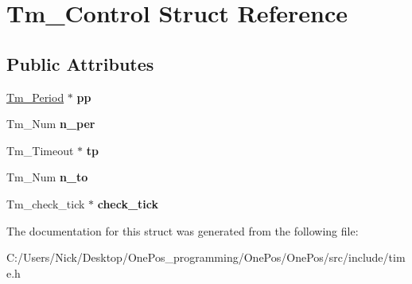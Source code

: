 \hypertarget{struct_tm___control}{\section{Tm\-\_\-\-Control Struct Reference}
\label{struct_tm___control}
}
\subsection*{Public Attributes}
\begin{DoxyCompactItemize}
\item 
\hypertarget{struct_tm___control_ac450cd3090f95328d7811b96deecdc17}{\hyperlink{struct_tm___period}{Tm\-\_\-\-Period} $\ast$ {\bfseries pp}}\label{struct_tm___control_ac450cd3090f95328d7811b96deecdc17}

\item 
\hypertarget{struct_tm___control_ad81de2fe53b1d8ad3c377749db5d26d4}{Tm\-\_\-\-Num {\bfseries n\-\_\-per}}\label{struct_tm___control_ad81de2fe53b1d8ad3c377749db5d26d4}

\item 
\hypertarget{struct_tm___control_abf67e09d2bec9804da39b82e8b663fb2}{Tm\-\_\-\-Timeout $\ast$ {\bfseries tp}}\label{struct_tm___control_abf67e09d2bec9804da39b82e8b663fb2}

\item 
\hypertarget{struct_tm___control_ab1d1906372bf292b1c2b3d3e0b2dd815}{Tm\-\_\-\-Num {\bfseries n\-\_\-to}}\label{struct_tm___control_ab1d1906372bf292b1c2b3d3e0b2dd815}

\item 
\hypertarget{struct_tm___control_a0063463ad20fd5170a3a2b1a0f9bcafc}{Tm\-\_\-check\-\_\-tick $\ast$ {\bfseries check\-\_\-tick}}\label{struct_tm___control_a0063463ad20fd5170a3a2b1a0f9bcafc}

\end{DoxyCompactItemize}


The documentation for this struct was generated from the following file\-:\begin{DoxyCompactItemize}
\item 
C\-:/\-Users/\-Nick/\-Desktop/\-One\-Pos\-\_\-programming/\-One\-Pos/\-One\-Pos/src/include/time.\-h\end{DoxyCompactItemize}
